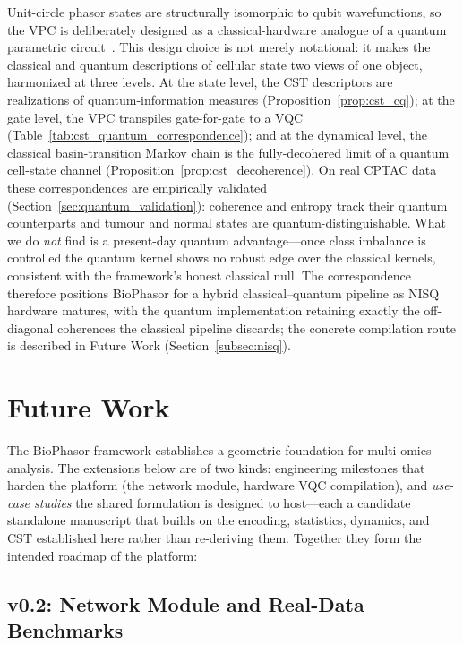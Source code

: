 \documentclass[preprint,12pt,amsmath,amssymb,superscriptaddress,floatfix]{revtex4-2}
\begin{document}
Unit-circle phasor states are structurally isomorphic to qubit
wavefunctions, so the VPC is deliberately designed as a classical-hardware
analogue of a quantum parametric circuit~\cite{ref_178,ref_179}. This design
choice is not merely notational: it makes the classical and quantum
descriptions of cellular state two views of one object, harmonized at three
levels. At the state level, the CST descriptors are realizations of
quantum-information measures (Proposition~\ref{prop:cst_cq}); at the gate level,
the VPC transpiles gate-for-gate to a VQC
(Table~\ref{tab:cst_quantum_correspondence}); and at the dynamical level, the
classical basin-transition Markov chain is the fully-decohered limit of a
quantum cell-state channel (Proposition~\ref{prop:cst_decoherence}). On real
CPTAC data these correspondences are empirically validated
(Section~\ref{sec:quantum_validation}): coherence and entropy track their
quantum counterparts and tumour and normal states are quantum-distinguishable.
What we do \emph{not} find is a present-day quantum advantage---once class
imbalance is controlled the quantum kernel shows no robust edge over the
classical kernels, consistent with the framework's honest classical null. The correspondence therefore positions
BioPhasor for a hybrid classical--quantum pipeline as NISQ hardware matures,
with the quantum implementation retaining exactly the off-diagonal coherences
the classical pipeline discards; the concrete compilation route is described in
Future Work (Section~\ref{subsec:nisq}).

\section{Future Work}
\label{sec:future_work}

The BioPhasor framework establishes a geometric foundation for multi-omics
analysis. The extensions below are of two kinds: engineering milestones that
harden the platform (the network module, hardware VQC compilation), and
\emph{use-case studies} the shared formulation is designed to host---each a
candidate standalone manuscript that builds on the encoding, statistics,
dynamics, and CST established here rather than re-deriving them. Together they
form the intended roadmap of the platform:

\subsection{v0.2: Network Module and Real-Data Benchmarks}
\end{document}
